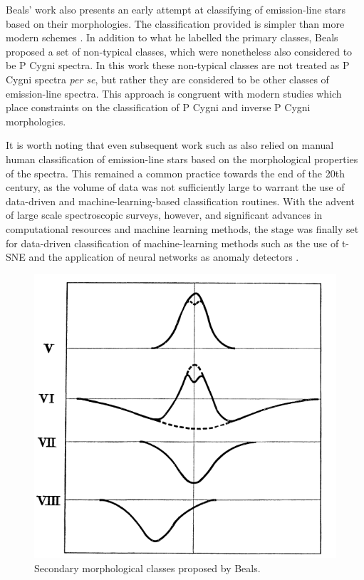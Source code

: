 Beals' work also presents an early attempt at classifying of emission-line stars based on their morphologies. The classification provided is simpler than more modern schemes \citep[e.g.,][]{reipurth1996halpha}. In addition to what he labelled the primary classes, Beals proposed a set of non-typical classes, which were nonetheless also considered to be P Cygni spectra. In this work these non-typical classes are not treated as P Cygni spectra {\em per se}, but rather they are considered to be other classes of emission-line spectra. This approach is congruent with modern studies \citep[e.g.,][]{vcotar2021galah, zhang2021catalog, reipurth1996halpha} which place constraints on the classification of P Cygni and inverse P Cygni morphologies. 

It is worth noting that even subsequent work such as \citet{reipurth1996halpha} also relied on manual human classification of emission-line stars based on the morphological properties of the spectra. This remained a common practice towards the end of the 20th century, as the volume of data was not sufficiently large to warrant the use of data-driven and machine-learning-based classification routines. With the advent of large scale spectroscopic surveys, however, and significant advances in computational resources and machine learning methods, the stage was finally set for data-driven classification of machine-learning methods such as the use of t-SNE \citep{traven2017galah} and the application of neural networks as anomaly detectors \citep{vcotar2021galah}.

\begin{figure}[!htb]
\centering
\includegraphics[scale=.50]{figures/beals class 2.png}
\caption{Secondary morphological classes proposed by Beals.}
\end{figure}

